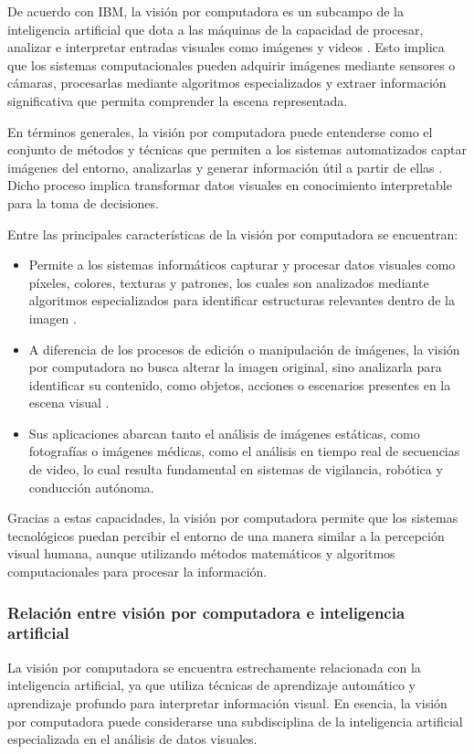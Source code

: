 De acuerdo con IBM, la visión por computadora es un subcampo de la inteligencia artificial que dota a las máquinas de la capacidad de procesar, analizar e interpretar entradas visuales como imágenes y videos \cite{ibm_computervision}. Esto implica que los sistemas computacionales pueden adquirir imágenes mediante sensores o cámaras, procesarlas mediante algoritmos especializados y extraer información significativa que permita comprender la escena representada.

En términos generales, la visión por computadora puede entenderse como el conjunto de métodos y técnicas que permiten a los sistemas automatizados captar imágenes del entorno, analizarlas y generar información útil a partir de ellas \cite{edsrobotics_vision}. Dicho proceso implica transformar datos visuales en conocimiento interpretable para la toma de decisiones.

Entre las principales características de la visión por computadora se encuentran:
\begin{itemize}
    \item Permite a los sistemas informáticos capturar y procesar datos visuales como píxeles, colores, texturas y patrones, los cuales son analizados mediante algoritmos especializados para identificar estructuras relevantes dentro de la imagen \cite{ibm_computervision}\cite{edsrobotics_vision}.
    \item A diferencia de los procesos de edición o manipulación de imágenes, la visión por computadora no busca alterar la imagen original, sino analizarla para identificar su contenido, como objetos, acciones o escenarios presentes en la escena visual \cite{ibm_computervision}\cite{fvivas_guia_cv}.
    \item Sus aplicaciones abarcan tanto el análisis de imágenes estáticas, como fotografías o imágenes médicas, como el análisis en tiempo real de secuencias de video, lo cual resulta fundamental en sistemas de vigilancia, robótica y conducción autónoma.
\end{itemize}

Gracias a estas capacidades, la visión por computadora permite que los sistemas tecnológicos puedan percibir el entorno de una manera similar a la percepción visual humana, aunque utilizando métodos matemáticos y algoritmos computacionales para procesar la información.


\subsubsection{Relación entre visión por computadora e inteligencia artificial}
La visión por computadora se encuentra estrechamente relacionada con la inteligencia artificial, ya que utiliza técnicas de aprendizaje automático y aprendizaje profundo para interpretar información visual. En esencia, la visión por computadora puede considerarse una subdisciplina de la inteligencia artificial especializada en el análisis de datos visuales.

